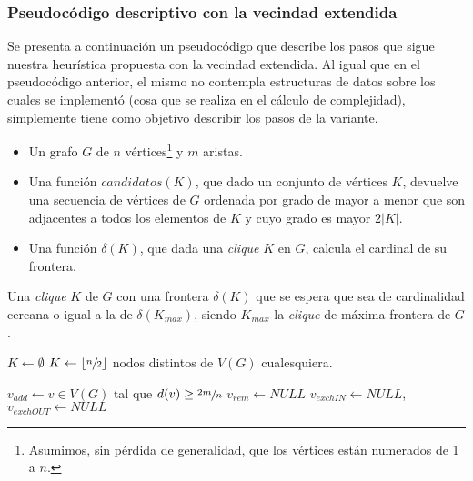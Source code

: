 \bigskip

\subsubsection{Pseudoc\'odigo descriptivo con la vecindad extendida}
\par Se presenta a continuaci\'on un pseudoc\'odigo que describe los pasos que sigue
    nuestra heur\'istica propuesta con la vecindad extendida. Al igual que en el
    pseudoc\'odigo anterior, el mismo no contempla estructuras de datos sobre
    los cuales se implement\'o (cosa que se realiza en el c\'alculo de complejidad),
    simplemente tiene como objetivo describir los pasos de la variante.

\bigskip
\begin{pseudocodigo}
    \Require\Statex
        \begin{itemize}
            \item Un grafo $G$ de $n$ v\'ertices\footnote{Asumimos, sin p\'erdida 
                de generalidad, que los v\'ertices est\'an numerados de 1 a $n$.}
                y $m$ aristas.

            \item Una funci\'on $candidatos(K)$, que dado un conjunto de v\'ertices
                $K$, devuelve una secuencia de v\'ertices de $G$ ordenada por grado
                de mayor a menor que son adjacentes a todos los elementos de $K$ y
                cuyo grado es mayor $2|K|$.

            \item Una funci\'on $\delta(K)$, que dada una \emph{clique} $K$ en $G$, calcula
                el cardinal de su frontera.
        \end{itemize}

    \Statex
    \Ensure Una \emph{clique} $K$ de $G$ con una frontera $\delta(K)$ que se
        espera que sea de cardinalidad cercana o igual a la de $\delta(K_{max})$,
        siendo $K_{max}$ la \emph{clique} de m\'axima frontera de $G$.

    \Statex
    \State $K \gets \emptyset$
        \State $K \gets \lfloor\sfrac{n}{2}\rfloor$ nodos distintos de $V(G)$ cualesquiera.
        \Statex

    \Else
        \State $v_{add} \gets v \in V(G)$ tal que $d(v) \geq \sfrac{2m}{n}$
        \State $v_{rem} \gets NULL$
        \State $v_{exchIN} \gets NULL$, $v_{exchOUT} \gets NULL$
        \Statex


\end{pseudocodigo}
